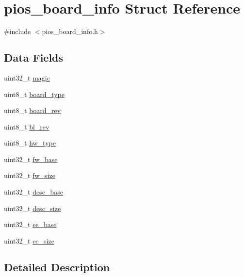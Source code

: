 \hypertarget{structpios__board__info}{\section{pios\-\_\-board\-\_\-info \-Struct \-Reference}
\label{structpios__board__info}
}


{\ttfamily \#include $<$pios\-\_\-board\-\_\-info.\-h$>$}

\subsection*{\-Data \-Fields}
\begin{DoxyCompactItemize}
\item 
uint32\-\_\-t \hyperlink{structpios__board__info_aab5bc5b7905e46df6cc7fd90fdb318d4}{magic}
\item 
uint8\-\_\-t \hyperlink{structpios__board__info_a5aff4607db694a6885c0ce5361afa9bb}{board\-\_\-type}
\item 
uint8\-\_\-t \hyperlink{structpios__board__info_a7c5ba691095b534927e3f0b6cc7202d6}{board\-\_\-rev}
\item 
uint8\-\_\-t \hyperlink{structpios__board__info_ab862f6bf9209684556e24b7e7cd014f7}{bl\-\_\-rev}
\item 
uint8\-\_\-t \hyperlink{structpios__board__info_a3a94af2d49603c2cbef32e8b56e5c057}{hw\-\_\-type}
\item 
uint32\-\_\-t \hyperlink{structpios__board__info_ab478e3140ec858f6347f061cf10d8cf5}{fw\-\_\-base}
\item 
uint32\-\_\-t \hyperlink{structpios__board__info_a0b8e1fae0f06a06384829d6f2dfe5f20}{fw\-\_\-size}
\item 
uint32\-\_\-t \hyperlink{structpios__board__info_abf65ae5cf522219445a2fc436a771365}{desc\-\_\-base}
\item 
uint32\-\_\-t \hyperlink{structpios__board__info_aab7aa8138d0df454158a720741756931}{desc\-\_\-size}
\item 
uint32\-\_\-t \hyperlink{structpios__board__info_a67ef167840d1d40c2ea296544f664c22}{ee\-\_\-base}
\item 
uint32\-\_\-t \hyperlink{structpios__board__info_a3ffc56de2b782e6e19c33e68ffd9716d}{ee\-\_\-size}
\end{DoxyCompactItemize}


\subsection{\-Detailed \-Description}


